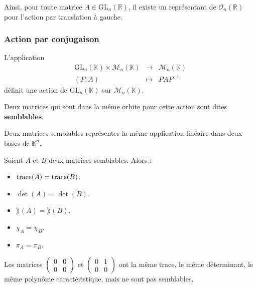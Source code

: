 	\begin{remark}
		Ainsi, pour toute matrice $A \in \mathrm{GL}_n(\mathbb{R})$, il existe un représentant de $\mathcal{O}_n(\mathbb{R})$ pour l'action par translation à gauche.
	\end{remark}

	\subsubsection{Action par conjugaison}


	\begin{proposition}
		L'application
		\[
			\begin{array}{ccc}
				\mathrm{GL}_n(\mathbb{K}) \times \mathcal{M}_n(\mathbb{K}) &\rightarrow& \mathcal{M}_n(\mathbb{K}) \\
				(P, A) &\mapsto& PAP^{-1}
			\end{array}
		\]
		définit une action de $\mathrm{GL}_n(\mathbb{K})$ sur $\mathcal{M}_n(\mathbb{K})$.
	\end{proposition}

	\begin{definition}
		Deux matrices qui sont dans la même orbite pour cette action sont dites \textbf{semblables}.
	\end{definition}


	\begin{remark}
		Deux matrices semblables représentes la même application linéaire dans deux bases de $\mathbb{K}^n$.
	\end{remark}


	\begin{theorem}
		Soient $A$ et $B$ deux matrices semblables. Alors :
		\begin{itemize}
			\item $\operatorname{trace}(A) = \operatorname{trace}(B)$.
			\item $\det(A) = \det(B)$.
			\item $\rang(A) = \rang(B)$.
			\item $\chi_A = \chi_B$.
			\item $\pi_A = \pi_B$.
		\end{itemize}
	\end{theorem}


	\begin{cexample}
		Les matrices $\begin{pmatrix} 0 & 0 \\ 0 & 0\end{pmatrix}$ et $\begin{pmatrix} 0 & 1 \\ 0 & 0\end{pmatrix}$ ont la même trace, le même déterminant, le même polynôme caractéristique, mais ne sont pas semblables.
	\end{cexample}

